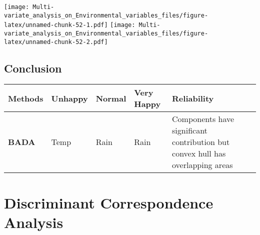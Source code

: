 \documentclass[]{book}
\begin{document}
\texttt{[image: Multi-variate\_analysis\_on\_Environmental\_variables\_files/figure-latex/unnamed-chunk-52-1.pdf]}
\texttt{[image: Multi-variate\_analysis\_on\_Environmental\_variables\_files/figure-latex/unnamed-chunk-52-2.pdf]}

\hypertarget{conclusion-2}{%
\section{Conclusion}\label{conclusion-2}}

\begin{longtable}[]{@{}lllll@{}}
\toprule
\begin{minipage}[b]{0.15\columnwidth}\raggedright
\textbf{Methods}\strut
\end{minipage} & \begin{minipage}[b]{0.20\columnwidth}\raggedright
\textbf{Unhappy}\strut
\end{minipage} & \begin{minipage}[b]{0.19\columnwidth}\raggedright
\textbf{Normal}\strut
\end{minipage} & \begin{minipage}[b]{0.22\columnwidth}\raggedright
\textbf{Very Happy}\strut
\end{minipage} & \begin{minipage}[b]{0.10\columnwidth}\raggedright
\textbf{Reliability}\strut
\end{minipage}\tabularnewline
\midrule
\endhead
\begin{minipage}[t]{0.15\columnwidth}\raggedright
\textbf{BADA}\strut
\end{minipage} & \begin{minipage}[t]{0.20\columnwidth}\raggedright
Temp\strut
\end{minipage} & \begin{minipage}[t]{0.19\columnwidth}\raggedright
Rain\strut
\end{minipage} & \begin{minipage}[t]{0.22\columnwidth}\raggedright
Rain\strut
\end{minipage} & \begin{minipage}[t]{0.10\columnwidth}\raggedright
Components have significant contribution but convex hull has overlapping
areas\strut
\end{minipage}\tabularnewline
\bottomrule
\end{longtable}

\hypertarget{discriminant-correspondence-analysis}{%
\chapter{Discriminant Correspondence
Analysis}\label{discriminant-correspondence-analysis}}
\end{document}

